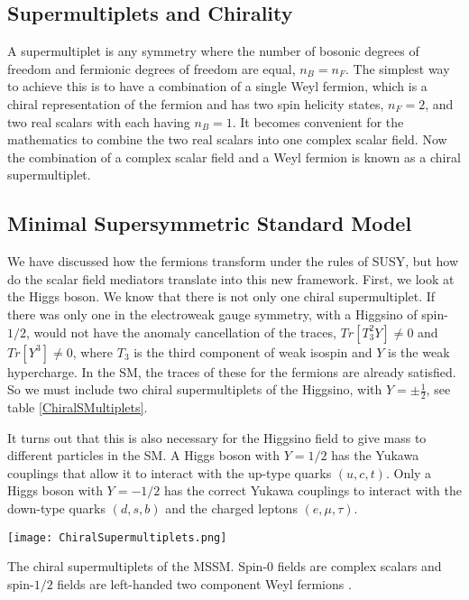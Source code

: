 \subsection{Supermultiplets and Chirality}
\label{subsec:chiral}

A supermultiplet is any symmetry where the number of bosonic degrees of freedom and fermionic degrees of freedom are equal, $n_B=n_F$. The simplest  way to achieve this is to have a combination of a single Weyl fermion, which is a chiral representation of the fermion and has two spin helicity states, $n_F=2$, and two real scalars with each having $n_B=1$. It becomes convenient for the mathematics to combine the two real scalars into one complex scalar field. Now the combination of a complex scalar field and a Weyl fermion is known as a chiral supermultiplet. 

\subsection{Minimal Supersymmetric Standard Model}
\label{sec:MSSM}

We have discussed how the fermions transform under the rules of SUSY, but how do the scalar field mediators translate into this new framework. First, we look at the Higgs boson. We know that there is not only one chiral supermultiplet. If there was only one in the electroweak gauge symmetry, with a Higgsino of spin-$1/2$, would not have the anomaly cancellation of the traces, $Tr[T^2_3Y]\neq0$ and $Tr[Y^3]\neq0$, where $T_3$ is the third component of weak isospin and $Y$ is the weak hypercharge. In the SM, the traces of these for the fermions are already satisfied. So we must include two chiral supermultiplets of the Higgsino, with $Y=\pm\frac{1}{2}$, see table \ref{ChiralSMultiplets}. 

It turns out that this is also necessary for the Higgsino field to give mass to different particles in the SM. A Higgs boson with $Y=1/2$ has the Yukawa couplings that allow it to interact with the up-type quarks $(u, c, t)$. Only a Higgs boson with $Y=-1/2$ has the correct Yukawa couplings to interact with the down-type quarks $(d, s, b)$ and the charged leptons $(e, \mu, \tau)$.

\begin{table}
 	\centering
	\texttt{[image: ChiralSupermultiplets.png]}
 	\caption[Chiral supermultiplets for fermions and bosons]{The chiral supermultiplets of the MSSM. Spin-0 fields are complex scalars and spin-$1/2$ fields are left-handed two component Weyl fermions \cite{martin_supersymmetry_1997}.}
 	\label{ChiralSMultiplets} 
\end{table}

